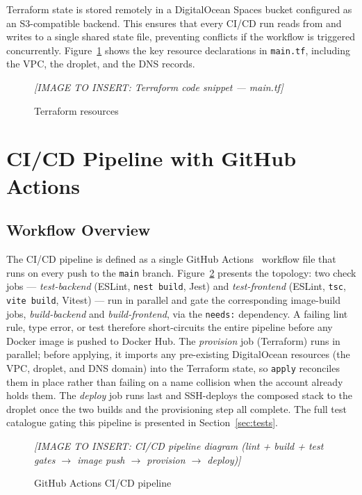 \documentclass[12pt, a4paper, oneside]{report}
\newcommand{\imagePlaceholder}[2][8cm]{%
  \begin{mdframed}[backgroundcolor=cheebolightgray,linecolor=gray!40]
    \centering
    \vspace{#1}
    \textit{\color{gray}[IMAGE TO INSERT: #2]}
    \vspace{8mm}
  \end{mdframed}
}
\begin{document}
Terraform state is stored remotely in a DigitalOcean Spaces bucket
configured as an S3-compatible backend. This ensures that every
CI/CD run reads from and writes to a single shared state file,
preventing conflicts if the workflow is triggered concurrently.
Figure~\ref{fig:terraform} shows the key resource declarations in
\texttt{main.tf}, including the VPC, the droplet, and the DNS records.

\begin{figure}[H]
  \centering
  \imagePlaceholder[6cm]{Terraform code snippet --- main.tf}
  \caption{Terraform resources}
  \label{fig:terraform}
\end{figure}

\section{CI/CD Pipeline with GitHub Actions}
\label{sec:cicd}

\subsection{Workflow Overview}

The CI/CD pipeline is defined as a single GitHub
Actions~\cite{gha} workflow
file that runs on every push to the \texttt{main} branch.
Figure~\ref{fig:cicd} presents the topology:
two check jobs --- \textit{test-backend} (ESLint, \texttt{nest build},
Jest) and \textit{test-frontend} (ESLint, \texttt{tsc},
\texttt{vite build}, Vitest) --- run in parallel and gate the
corresponding image-build jobs, \textit{build-backend} and
\textit{build-frontend}, via the \texttt{needs:} dependency.
A failing lint rule, type error, or test therefore short-circuits the
entire pipeline before any Docker image is pushed to Docker Hub. The
\textit{provision} job (Terraform) runs in parallel; before applying,
it imports any pre-existing DigitalOcean resources (the VPC, droplet,
and DNS domain) into the Terraform state, so \texttt{apply} reconciles
them in place rather than failing on a name collision when the account
already holds them. The \textit{deploy} job
runs last and SSH-deploys the composed stack to the droplet once
the two builds and the provisioning step all complete. The full
test catalogue gating this pipeline is presented in
Section~\ref{sec:tests}.

\begin{figure}[H]
  \centering
  \imagePlaceholder[7cm]{CI/CD pipeline diagram (lint + build + test gates $\rightarrow$ image push $\rightarrow$ provision $\rightarrow$ deploy)}
  \caption{GitHub Actions CI/CD pipeline}
  \label{fig:cicd}
\end{figure}
\end{document}
